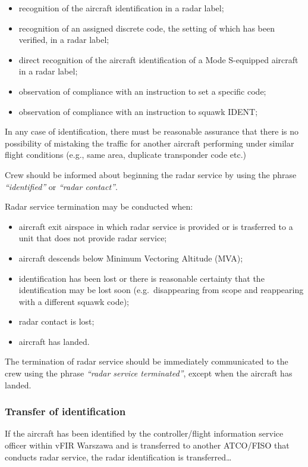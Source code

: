 \begin{itemize}
\item recognition of the aircraft identification in a radar label;
\item recognition of an assigned discrete code, the setting of which has been
verified, in a radar label;
\item direct recognition of the aircraft identification of a Mode S-equipped
aircraft in a radar label;
\item observation of compliance with an instruction to set a specific code;
\item observation of compliance with an instruction to squawk IDENT;
\end{itemize}

In any case of identification, there must be reasonable assurance that there is
no possibility of mistaking the traffic for another aircraft performing under
similar flight conditions (e.g., same area, duplicate transponder code etc.)

Crew should be informed about beginning the radar service by using the phrase
\textit{``identified''} or \textit{``radar contact''}.

Radar service termination may be conducted when:

\begin{itemize}
\item aircraft exit airspace in which radar service is provided or is trasferred
to a unit that does not provide radar service;
\item aircraft descends below Minimum Vectoring Altitude (MVA);
\item identification has been lost or there is reasonable certainty that the
identification may be lost soon (e.g.~disappearing from scope and reappearing
with a different squawk code);
\item radar contact is lost;
\item aircraft has landed.
\end{itemize}

The termination of radar service should be immediately communicated to the crew
using the phrase \textit{``radar service terminated''}, except when the aircraft
has landed.

\subsubsection{Transfer of identification}

If the aircraft has been identified by the controller/flight information service
officer within vFIR Warszawa and is transferred to another ATCO/FISO that
conducts radar service, the radar identification is transferred\dots

